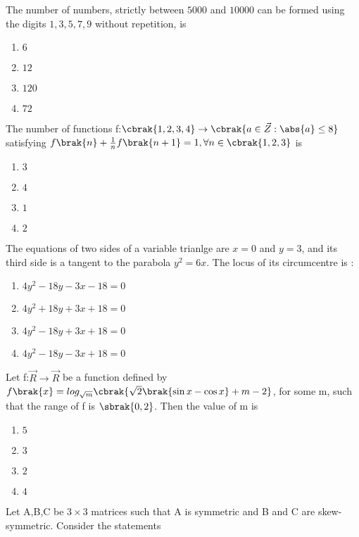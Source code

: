     \item The number of numbers, strictly between $5000$ and $10000$ can be formed using the digits $1,3,5,7,9$ without repetition, is \hfill{}
    \begin{enumerate}
        \item $6$
        \item $12$
        \item $120$
        \item $72$
    \end{enumerate}
    \item The number of functions f:$\cbrak{1,2,3,4} \to \cbrak{a \in \vec{Z}:\abs{a}\leq8}$ satisfying $f\brak{n}+\frac{1}{n}f\brak{n+1}=1,\forall n \in \cbrak{1,2,3}$ is \hfill{}
    \begin{enumerate}
        \item $3$
        \item $4$
        \item $1$
        \item $2$
    \end{enumerate}
    \item The equations of two sides of a variable trianlge are $x=0$ and $y=3$, and its third side is a tangent to the parabola $y^2=6x$. The locus of its circumcentre is : \hfill{}
    \begin{enumerate}
        \item $4y^2-18y-3x-18=0$
        \item $4y^2+18y+3x+18=0$
        \item $4y^2-18y+3x+18=0$
        \item $4y^2-18y-3x+18=0$
    \end{enumerate}
    \item Let f:$\vec{R} \to \vec{R}$ be a function defined by $f\brak{x}=log_{\sqrt{m}}\cbrak{\sqrt{2}\brak{\sin x-\cos x}+m-2}$, for some m, such that the range of f is $\sbrak{0,2}$. Then the value of m is \hfill{}
    \begin{enumerate}
        \item $5$
        \item $3$
        \item $2$
        \item $4$
    \end{enumerate}
    \item Let A,B,C be $3 \times 3$ matrices such that A is symmetric and B and C are skew-symmetric. Consider the statements\\
